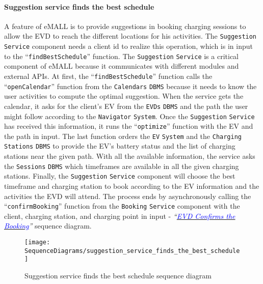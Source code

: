 \paragraph{\texorpdfstring{\protect\hypertarget{suggestionfindsschedule}{Suggestion service finds the best schedule}}{}}
A feature of eMALL is to provide suggestions in booking charging sessions to allow the EVD to reach the different locations for his activities.
The \verb|Suggestion| \verb|Service| component needs a client id to realize this operation, which is in input to the ``\verb|findBestSchedule|'' function.
The \verb|Suggestion| \verb|Service| is a critical component of eMALL because it communicates with different modules and external APIs.
At first, the ``\verb|findBestSchedule|'' function calls the ``\verb|openCalendar|'' function from the \verb|Calendars| \verb|DBMS| because it needs to know the user activities to compute the optimal suggestion.
When the service gets the calendar, it asks for the client's EV from the \verb|EVDs| \verb|DBMS| and the path the user might follow according to the \verb|Navigator| \verb|System|.
Once the \verb|Suggestion| \verb|Service| has received this information, it runs the ``\verb|optimize|'' function with the EV and the path in input.
The last function orders the \verb|EV| \verb|System| and the \verb|Charging| \verb|Stations| \verb|DBMS| to provide the EV's battery status and the list of charging stations near the given path.
With all the available information, the service asks the \verb|Sessions| \verb|DBMS| which timeframes are available in all the given charging stations.
Finally, the \verb|Suggestion| \verb|Service| component will choose the best timeframe and charging station to book according to the EV information and the activities the EVD will attend.
The process ends by asynchronously calling the ``\verb|confirmBooking|'' function from the \verb|Booking| \verb|Service| component with the client, charging station, and charging point in input - \textit{``}\hyperlink{evdconfirmsbooking}{\textcolor{blue}{\textit{EVD Confirms the Booking}}}\textit{''} sequence diagram.
\begin{figure}[H]
    \begin{center}
        \texttt{[image: SequenceDiagrams/suggestion\_service\_finds\_the\_best\_schedule]}
        \caption{Suggestion service finds the best schedule sequence diagram}
        \label{suggestion_service_finds_best_schedule}
    \end{center}
\end{figure}

